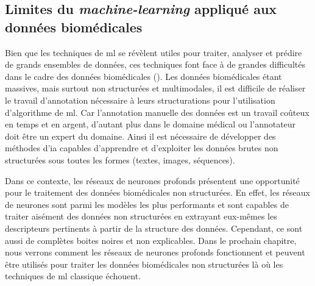 \subsection{Limites du \textit{machine-learning} appliqué aux données biomédicales}
Bien que les techniques de \gls{ml} se révèlent utiles pour traiter, analyser et prédire de grands ensembles de données, ces techniques font face à de grandes difficultés dans le cadre des données biomédicales (\cite{martinez-garcia_data_2022}). Les données biomédicales étant massives, mais surtout non structurées et multimodales, il est difficile de réaliser le travail d'annotation nécessaire à leurs structurations pour l'utilisation d'algorithme de \gls{ml}. Car l'annotation manuelle des données est un travail coûteux en temps et en argent, d'autant plus dans le domaine médical ou l'annotateur doit être un expert du domaine. Ainsi il est nécessaire de développer des méthodes d'\gls{ia} capables d'apprendre et d'exploiter les données brutes non structurées sous toutes les formes (textes, images, séquences).

Dans ce contexte, les réseaux de neurones profonds présentent une opportunité pour le traitement des données biomédicales non structurées. En effet, les réseaux de neurones sont parmi les modèles les plus performants et sont capables de traiter aisément des données non structurées en extrayant eux-mêmes les descripteurs pertinents à partir de la structure des données. Cependant, ce sont aussi de complètes boites noires et non explicables. Dans le prochain chapitre, nous verrons comment les réseaux de neurones profonds fonctionnent et peuvent être utilisés pour traiter les données biomédicales non structurées là où les techniques de \gls{ml} classique échouent.